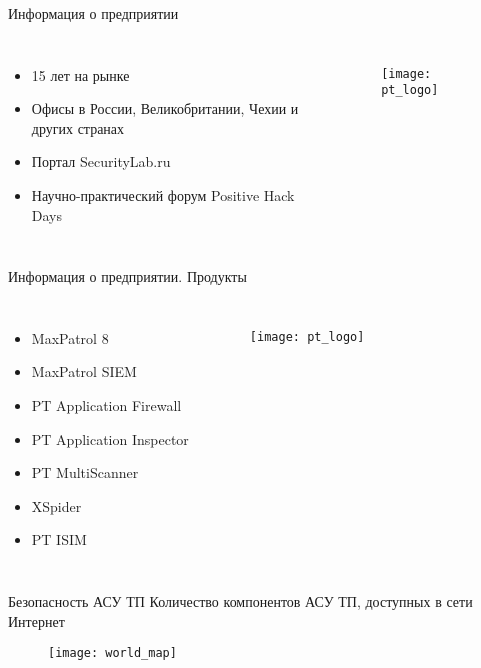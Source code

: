 \begin{frame}{Информация о предприятии}
    \begin{columns}
            \begin{itemize}
                \item 15 лет на рынке
                \item Офисы в России, Великобритании, Чехии и других странах
                \item Портал SecurityLab.ru
                \item Научно-практический форум Positive Hack Days
            \end{itemize}
            \begin{figure}[h!]
                \centering
                \texttt{[image: pt\_logo]}
                \label{img:pt_logo}
            \end{figure}
    \end{columns}
\end{frame}

\begin{frame}{Информация о предприятии. Продукты}
    \begin{columns}
            \begin{itemize}
                \item MaxPatrol 8
                \item MaxPatrol SIEM
                \item PT Application Firewall
                \item PT Application Inspector
                \item PT MultiScanner
                \item XSpider
                \item PT ISIM
            \end{itemize}
            \begin{figure}[h!]
                \centering
                \texttt{[image: pt\_logo]}
                \label{img:pt_logo}
            \end{figure}
    \end{columns}
\end{frame}

\begin{frame}{Безопасность АСУ ТП}
    Количество компонентов АСУ ТП, доступных в сети Интернет
    \begin{figure}[h!]
        \centering
        \texttt{[image: world\_map]}
        \label{img:world_map}
    \end{figure}
\end{frame}

